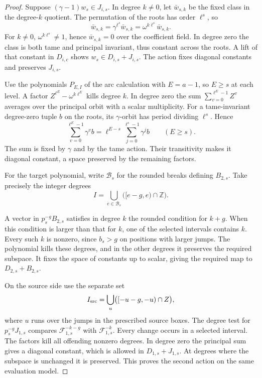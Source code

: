 \begin{proof}
Suppose \((\gamma-1)w_s\in J_{i,s}\). In degree \(k\ne0\),
let \(\bar w_{s,k}\) be the fixed class in the degree-\(k\)
quotient. The permutation of the roots has order \(\ell^s\), so
\[
   \bar w_{s,k}=\gamma^{\ell^s}\bar w_{s,k}
               =\omega^{k\ell^s}\bar w_{s,k}.
\]
For \(k\ne0\), \(\omega^{k\ell^s}\ne1\), hence
\(\bar w_{s,k}=0\) over the coefficient field. In degree zero the class is both tame and
principal invariant, thus constant across the roots. A lift
of that constant in \(D_{i,c}\) shows \(w_s\in D_{i,s}+J_{i,s}\).
The action fixes diagonal constants and preserves \(J_{i,s}\).

Use the polynomials \(P_{E,I}\) of the arc calculation with
\(E=a-1\), so \(E\ge s\) at each level.
A factor \(Z^{\ell^E}-\omega^{k\ell^E}\) kills degree \(k\).
In degree zero the sum \(\sum_{v=0}^{\ell^E-1}Z^v\) averages
over the principal orbit with a scalar multiplicity.
For a tame-invariant degree-zero tuple \(b\) on the roots, its
\(\gamma\)-orbit has period dividing \(\ell^s\). Hence
\[
 \sum_{v=0}^{\ell^E-1}\gamma^v b
   =\ell^{E-s}\sum_{j=0}^{\ell^s-1}\gamma^j b
   \qquad(E\ge s).
\]
The sum is fixed by \(\gamma\) and by the tame action. Their transitivity
makes it diagonal constant, a space preserved by the remaining factors.

For the target polynomial, write \(\mathcal B_s\) for the rounded breaks defining \(B_{2,s}\). Take precisely the integer degrees
\[
 I=\bigcup_{e\in\mathcal B_s}\bigl([e-g,e)\cap\mathbb Z\bigr).
\]

A vector in \(p_s^{-g}B_{2,s}\) satisfies in degree \(k\)
the rounded condition for \(k+g\).
When this condition is larger than that for \(k\), one of
the selected intervals contains \(k\). Every such \(k\)
is nonzero, since \(b_s>g\) on positions with larger jumps.
The polynomial kills these degrees, and in the other degrees
it preserves the required subspace. It fixes the space of
constants up to scalar, giving the required map to
\(D_{2,s}+B_{2,s}\).

On the source side use the separate set
\[
 I_{\rm src}=\bigcup_{u}\bigl([-u-g,-u)\cap\mathbb Z\bigr),
\]
where \(u\) runs over the jumps in the prescribed source boxes.
The degree test for \(p_s^{-g}J_{1,s}\) compares
\(\mathcal F_{1,s}^{-k-g}\) with \(\mathcal F_{1,s}^{-k}\).
Every change occurs in a selected interval. The factors kill
all offending nonzero degrees. In degree zero the principal
sum gives a diagonal constant, which is allowed in
\(D_{1,s}+J_{1,s}\). At degrees where the subspace is
unchanged it is preserved. This proves the second action
on the same evaluation model.


\end{proof}
